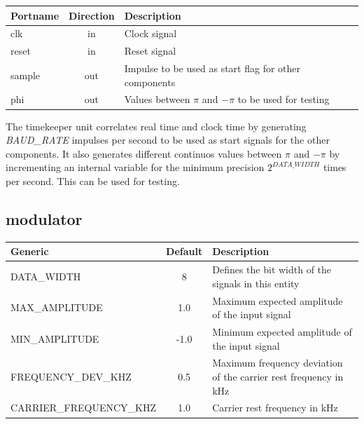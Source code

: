 \begin{center}
	\begin{tabular}{ | l | c | l | }
		\hline
		\textbf{Portname} & \textbf{Direction} & \textbf{Description} \\
		\hline
		clk & in & Clock signal \\
		reset & in  & Reset signal \\
		sample & out  & Impulse to be used as start flag for other components \\
		phi & out  & Values between $\pi$ and $-\pi$ to be used for testing \\
		\hline
	\end{tabular} 
\end{center}

The timekeeper unit correlates real time and clock time by generating \textit{BAUD\_RATE} impulses per second to be used as start signals for the other components. It also generates 
different continuos values between $\pi$ and $-\pi$ by incrementing an internal variable for the minimum precision $2^{DATA\_WIDTH}$ times per second. This can be used for testing.


\subsection{modulator}

\begin{center}
	\begin{tabular}{ | l | c | l | }
		\hline
		\textbf{Generic} & \textbf{Default} & \textbf{Description} \\ \hline
		DATA\_WIDTH & 8 & Defines the bit width of the signals in this entity \\
		MAX\_AMPLITUDE & 1.0 & Maximum expected amplitude of the input signal \\
		MIN\_AMPLITUDE & -1.0 & Minimum expected amplitude of the input signal \\
		FREQUENCY\_DEV\_KHZ & 0.5 & Maximum frequency deviation of the carrier rest frequency in kHz \\
		CARRIER\_FREQUENCY\_KHZ & 1.0 & Carrier rest frequency in kHz \\
		\hline
	\end{tabular} 
\end{center}

